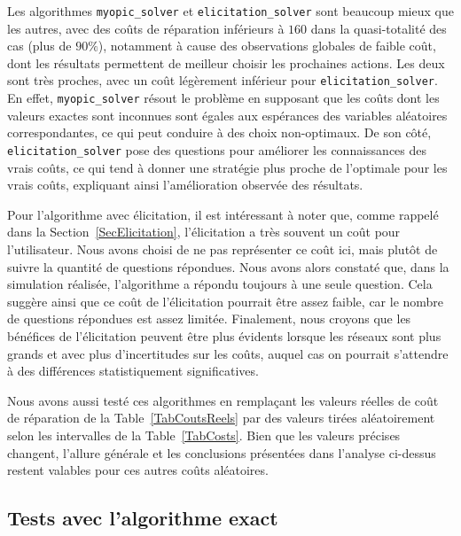 \documentclass[a4paper,11pt]{article}
\theoremstyle{plain}
\theoremstyle{definition}
\begin{document}
Les algorithmes \texttt{myopic\_solver} et \texttt{elicitation\_solver} sont beaucoup mieux que les autres, avec des coûts de réparation inférieurs à $160$ dans la quasi-totalité des cas (plus de $90\%$), notamment à cause des observations globales de faible coût, dont les résultats permettent de meilleur choisir les prochaines actions. Les deux sont très proches, avec un coût légèrement inférieur pour \texttt{elicitation\_solver}. En effet, \texttt{myopic\_solver} résout le problème en supposant que les coûts dont les valeurs exactes sont inconnues sont égales aux espérances des variables aléatoires correspondantes, ce qui peut conduire à des choix non-optimaux. De son côté, \texttt{elicitation\_solver} pose des questions pour améliorer les connaissances des vrais coûts, ce qui tend à donner une stratégie plus proche de l'optimale pour les vrais coûts, expliquant ainsi l'amélioration observée des résultats.

Pour l'algorithme avec élicitation, il est intéressant à noter que, comme rappelé dans la Section~\ref{SecElicitation}, l'élicitation a très souvent un coût pour l'utilisateur. Nous avons choisi de ne pas représenter ce coût ici, mais plutôt de suivre la quantité de questions répondues. Nous avons alors constaté que, dans la simulation réalisée, l'algorithme a répondu toujours à une seule question. Cela suggère ainsi que ce coût de l'élicitation pourrait être assez faible, car le nombre de questions répondues est assez limitée. Finalement, nous croyons que les bénéfices de l'élicitation peuvent être plus évidents lorsque les réseaux sont plus grands et avec plus d'incertitudes sur les coûts, auquel cas on pourrait s'attendre à des différences statistiquement significatives.

Nous avons aussi testé ces algorithmes en remplaçant les valeurs réelles de coût de réparation de la Table~\ref{TabCoutsReels} par des valeurs tirées aléatoirement selon les intervalles de la Table~\ref{TabCosts}. Bien que les valeurs précises changent, l'allure générale et les conclusions présentées dans l'analyse ci-dessus restent valables pour ces autres coûts aléatoires.

\subsection{Tests avec l'algorithme exact}
\end{document}
